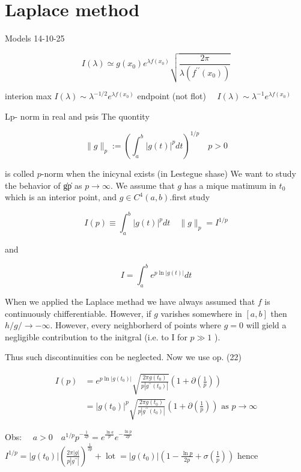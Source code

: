 \section{Laplace method}
Models 14-10-25

$$ 
I(\lambda) \simeq g\left(x_{0}\right) e^{\lambda f\left(x_{0}\right)} \sqrt{\frac{2 \pi}{\lambda\left(f^{\prime \prime}\left(x_{0}\right)\right)}} 
$$ 

interion max $I(\lambda) \sim \lambda^{-1 / 2} e^{\lambda f\left(x_{0}\right)}$ endpoint (not flot) $\quad I(\lambda) \sim \lambda^{-1} e^{\lambda f\left(x_{0}\right)}$

Lp- norm in real and psis
The quontity

$$ 
\|g\|_{p}:=\left(\int_{a}^{b}|g(t)|^{p} d t\right)^{1 / p} \quad p>0 
$$ 

is colled $p$-norm when the inicynal exists (in Lestegue shase) We want to study the behavior of \|g\|p as $p \rightarrow \infty$. We assume that $g$ has a mique matimum in $t_{0}$ which is an interior point, and $g \in C^{4}(a, b)$.\We first study

$$ 
I(p) \equiv \int_{a}^{b}|g(t)|^{p} d t \quad \|g\|_{p}=I^{1 / p} 
$$ 

and

$$ 
I=\int_{a}^{b} e^{p \ln |g(t)|} d t 
$$ 

When we applied the Laplace methad we have always assumed that $f$ is continuously chifferentiable. However, if $g$ varishes somewhere in $[a, b]$ then $h / g / \rightarrow-\infty$. However, every neighborherd of points where $g=0$ will gield a negligible contribution to the initgral (i.e. to I for $p \gg 1$ ).

Thus such discontinuities con be neglected. Now we use op. (22)

$$ 
\begin{aligned}
I(p) & =e^{p \ln \left|g\left(t_{0}\right)\right|} \sqrt{\frac{2 \pi g\left(t_{0}\right)}{p\left|g^{\prime \prime}\left(t_{0}\right)\right|}}\left(1+\partial\left(\frac{1}{p}\right)\right) \\
& =\left|g\left(t_{0}\right)\right|^{p} \sqrt{\frac{2 \pi g\left(t_{0}\right)}{p\left|g^{\prime \prime}\left(t_{0}\right)\right|}}\left(1+\partial\left(\frac{1}{p}\right)\right) \text { as } p \rightarrow \infty 
\end{aligned}
$$ 

Obs: $\quad a>0 \quad a^{1 / p} p^{-\frac{1}{2 p}}=e^{\frac{\ln a}{p}} e^{-\frac{\ln p}{2 p}}$
$I^{1 / p}=\left|g\left(t_{0}\right)\right|\left(\frac{2 \pi|g|}{p\left|g^{\prime \prime}\right|}\right)^{\frac{1}{2 p}}+\operatorname{lot}=\left|g\left(t_{0}\right)\right|\left(1-\frac{\ln p}{2 p}+\sigma\left(\frac{1}{p}\right)\right)$
hence

